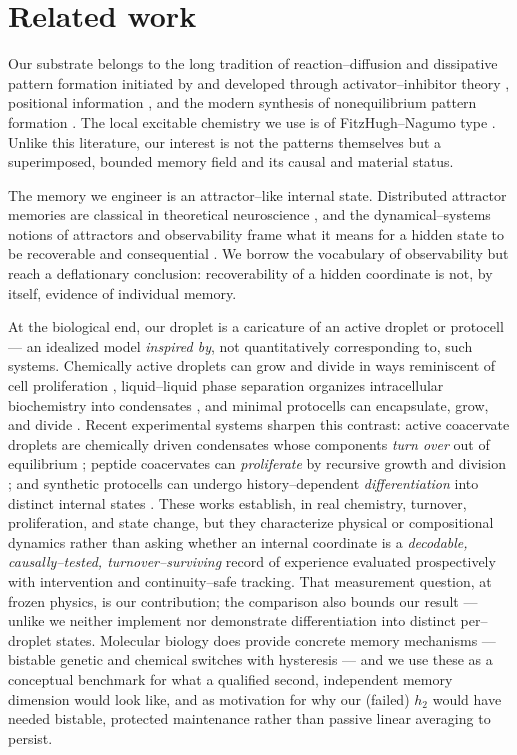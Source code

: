 \documentclass[11pt]{article}
\begin{document}
\section{Related work}
Our substrate belongs to the long tradition of reaction--diffusion and dissipative pattern formation initiated by
\citet{turing1952} and developed through activator--inhibitor theory \citep{gierer1972}, positional information
\citep{wolpert1969}, and the modern synthesis of nonequilibrium pattern formation \citep{cross1993,kondo2010,nicolis1977}.
The local excitable chemistry we use is of FitzHugh--Nagumo type \citep{fitzhugh1961,nagumo1962}. Unlike this
literature, our interest is not the patterns themselves but a superimposed, bounded memory field and its causal and
material status.

The memory we engineer is an attractor--like internal state. Distributed attractor memories are classical in
theoretical neuroscience \citep{hopfield1982}, and the dynamical--systems notions of attractors and observability
frame what it means for a hidden state to be recoverable and consequential \citep{strogatz1994,hermann1977}. We
borrow the vocabulary of observability but reach a deflationary conclusion: recoverability of a hidden coordinate
is not, by itself, evidence of individual memory.

At the biological end, our droplet is a caricature of an active droplet or protocell --- an idealized model \emph{inspired by}, not quantitatively corresponding to, such systems. Chemically active droplets can
grow and divide in ways reminiscent of cell proliferation \citep{zwicker2017}, liquid--liquid phase separation
organizes intracellular biochemistry into condensates \citep{brangwynne2009,hyman2014,banani2017}, and minimal
protocells can encapsulate, grow, and divide \citep{szostak2001,hanczyc2003}. Recent experimental systems sharpen this contrast: active coacervate droplets are chemically driven condensates whose components \emph{turn over} out of equilibrium \citep{nakashima2021}; peptide coacervates can \emph{proliferate} by recursive growth and division \citep{matsuo2021}; and synthetic protocells can undergo history--dependent \emph{differentiation} into distinct internal states \citep{higashi2025}. These works establish, in real chemistry, turnover, proliferation, and state change, but they characterize physical or compositional dynamics rather than asking whether an internal coordinate is a \emph{decodable, causally--tested, turnover--surviving} record of experience evaluated prospectively with intervention and continuity--safe tracking. That measurement question, at frozen physics, is our contribution; the comparison also bounds our result --- unlike \citet{higashi2025} we neither implement nor demonstrate differentiation into distinct per--droplet states. Molecular biology
does provide concrete memory mechanisms --- bistable genetic and chemical switches with hysteresis
\citep{gardner2000,elowitz2000,ferrell2002,ptashne2004} --- and we use these as a conceptual benchmark for what a
qualified second, independent memory dimension would look like, and as motivation for why our (failed) $h_2$ would
have needed bistable, protected maintenance rather than passive linear averaging to persist.
\end{document}
